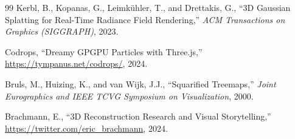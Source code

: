 \documentclass[11pt, letterpaper]{article}
\begin{document}
\begin{thebibliography}{99}
    Kerbl, B., Kopanas, G., Leimk\"{u}hler, T., and Drettakis, G.,
    ``3D Gaussian Splatting for Real-Time Radiance Field Rendering,''
    \textit{ACM Transactions on Graphics (SIGGRAPH)}, 2023.

    Codrops,
    ``Dreamy GPGPU Particles with Three.js,''
    \url{https://tympanus.net/codrops/}, 2024.

    Bruls, M., Huizing, K., and van Wijk, J.J.,
    ``Squarified Treemaps,''
    \textit{Joint Eurographics and IEEE TCVG Symposium on Visualization}, 2000.

    Brachmann, E.,
    ``3D Reconstruction Research and Visual Storytelling,''
    \url{https://twitter.com/eric_brachmann}, 2024.

\end{thebibliography}
\end{document}
